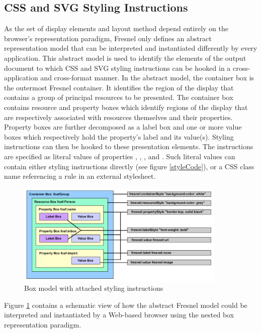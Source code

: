 \subsection{CSS and SVG Styling Instructions}

As the set of display elements and layout method depend entirely on the browser's representation paradigm, Fresnel only defines an abstract representation model that can be interpreted and instantiated differently by every application. This abstract model is used to identify the elements of the output document to which CSS and SVG styling instructions can be hooked in a cross-application and cross-format manner. In the abstract model, the container box is the outermost Fresnel container. It identifies the region of the display that contains a group of principal resources to be presented. The container box contains resource and property boxes which identify regions of the display that are respectively associated with resources themselves and their properties. Property boxes are further decomposed as a label box and one or more value boxes which respectively hold the property's label and its value(s). Styling instructions can then be hooked to these presentation elements. The instructions are specified as literal values of properties , , ,  and . Such literal values can contain either styling instructions directly (see figure \ref{styleCode}), or a CSS class name referencing a rule in an external stylesheet.

\begin{figure}
    \begin{center}
      \includegraphics[width=10cm]{boxmodelexample.pdf}
    \end{center}
    \vspace{-0.3cm}
    \caption{Box model with attached styling instructions}
    \label{boxModel}
\end{figure}

Figure \ref{boxModel} contains a schematic view of how the abstract Fresnel model could be interpreted and instantiated by a Web-based browser using the nested box representation paradigm. 

